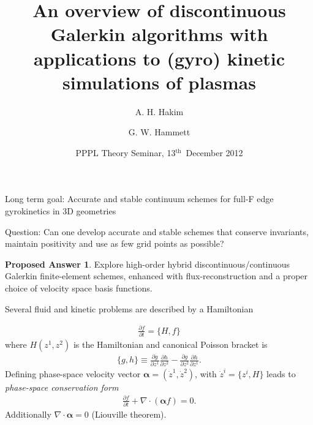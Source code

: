\documentclass[pdf]{beamer}
\title[Continuum Discontinuous Galerkin Algorithms]{An overview of
  discontinuous Galerkin algorithms with applications to (gyro)
  kinetic simulations of plasmas}%
\author{A. H. Hakim \and G. W. Hammett}%
\institute[http://www.ammar-hakim.org/sj] %
{
  Princeton Plasma Physics Laboratory, Princeton, NJ\\
  ammar@princeton.edu\\
  \url{http://www.ammar-hakim.org/sj}
}
\date[Theory Seminar]{PPPL Theory Seminar, 13$^\mathrm{th}$~December
  2012}
\newcommand{\pfrac}[2]{\frac{\partial #1}{\partial #2}}
\newcommand{\gvec}[1]{\boldsymbol{#1}}
\theoremstyle{definition}
\newtheorem{proposed}{Proposed Answer}
\begin{document}
\begin{frame}
  \titlepage
\end{frame}

\begin{frame}{Long term goal: Accurate and stable continuum schemes
    for full-F edge gyrokinetics in 3D geometries}

  Question: Can one develop accurate and stable schemes that conserve
  invariants, maintain positivity and use as few grid points as
  possible?

  \begin{proposed}
    Explore high-order hybrid discontinuous/continuous Galerkin
    finite-element schemes, enhanced with flux-reconstruction and a
    proper choice of velocity space basis functions.
  \end{proposed}

\end{frame}

\begin{frame}{Several fluid and kinetic problems are described by a
    Hamiltonian}%

  \begin{align*}
    \pfrac{f}{t} = \{H,f\}
  \end{align*}
  where $H(z^1,z^2)$ is the Hamiltonian and canonical Poisson bracket
  is
  \begin{align*}
    \{g,h\} \equiv \pfrac{g}{z^1}\pfrac{h}{z^2} -
    \pfrac{g}{z^2}\pfrac{h}{z^1}.
  \end{align*}
  Defining phase-space velocity vector $\gvec{\alpha} = (\dot{z}^1,
  \dot{z}^2)$, with $\dot{z}^i = \{z^i,H\}$ leads to \emph{phase-space
    conservation form}
  \begin{align*}
    \pfrac{f}{t} + \nabla\cdot\left(\gvec{\alpha}f\right) = 0.
  \end{align*}
  Additionally $\nabla\cdot\gvec{\alpha} = 0$ (Liouville theorem).
\end{frame}
\end{document}
